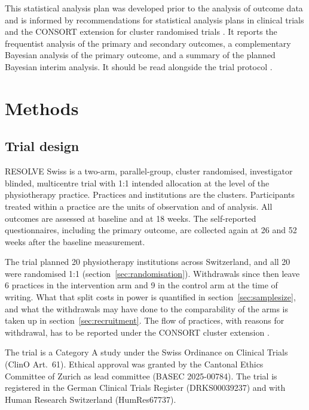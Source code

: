 \documentclass[11pt,a4paper]{article}
\begin{document}
This statistical analysis plan was developed prior to the analysis of outcome
data and is informed by recommendations for statistical analysis plans in
clinical trials \citep{gamble2017} and the CONSORT extension for cluster
randomised trials \citep{campbell2012}. It reports the frequentist analysis
of the primary and secondary outcomes, a complementary Bayesian analysis of
the primary outcome, and a summary of the planned Bayesian interim analysis.
It should be read alongside the trial protocol \citep{protocol2025}.

\section{Methods}

\subsection{Trial design}

RESOLVE Swiss is a two-arm, parallel-group, cluster randomised, investigator
blinded, multicentre trial with 1:1 intended allocation at the level of the
physiotherapy practice. Practices and institutions are the
clusters. Participants treated within a practice are the units of observation and of
analysis. All outcomes are assessed at baseline and at 18 weeks. The
self-reported questionnaires, including the primary outcome, are collected
again at 26 and 52 weeks after the baseline measurement.

The trial planned 20 physiotherapy institutions across Switzerland, and all
20 were randomised 1:1 (section~\ref{sec:randomisation}). Withdrawals since
then leave 6 practices in the intervention arm and 9 in the control arm at
the time of writing. What that split
costs in power is quantified in section~\ref{sec:samplesize}, and what the
withdrawals may have done to the comparability of the arms is taken up in
section~\ref{sec:recruitment}. The flow of practices, with reasons for
withdrawal, has to be reported under the CONSORT cluster extension
\citep{campbell2012}.

The trial is a Category A study under the Swiss Ordinance on Clinical Trials
(ClinO Art.~61). Ethical approval was granted by the Cantonal Ethics
Committee of Zurich as lead committee (BASEC 2025-00784). The trial is
registered in the German Clinical Trials Register (DRKS00039237) and with
Human Research Switzerland (HumRes67737).
\end{document}

